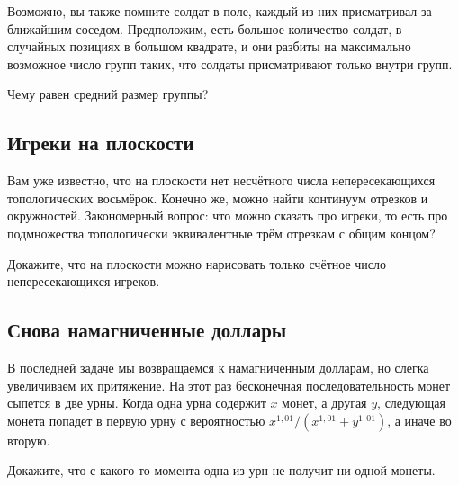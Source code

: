 Возможно, вы также помните солдат в поле, каждый из них присматривал за ближайшим соседом.
Предположим, есть большое количество солдат, в случайных позициях в большом квадрате, и они разбиты на максимально возможное число групп таких, что солдаты присматривают только внутри групп.

Чему равен средний размер группы?

\subsection*{Игреки на плоскости}

Вам уже известно, что на плоскости нет несчётного числа непересекающихся топологических восьмёрок.
Конечно же, можно найти континуум отрезков и окружностей.
Закономерный вопрос: что можно сказать про игреки, то есть про подмножества топологически эквивалентные трём отрезкам с общим концом?

Докажите, что на плоскости можно нарисовать только счётное число непересекающихся игреков.

\subsection*{Снова намагниченные доллары}

В последней задаче мы возвращаемся к намагниченным долларам, но слегка увеличиваем их притяжение.
На этот раз бесконечная последовательность монет сыпется в две урны.
Когда одна урна содержит $x$ монет, а другая $y$, следующая монета попадет в первую урну с вероятностью $x^{1{,}01}/(x^{1{,}01}+y^{1{,}01})$, а иначе во вторую.

Докажите, что с какого-то момента одна из урн не получит ни одной монеты.
